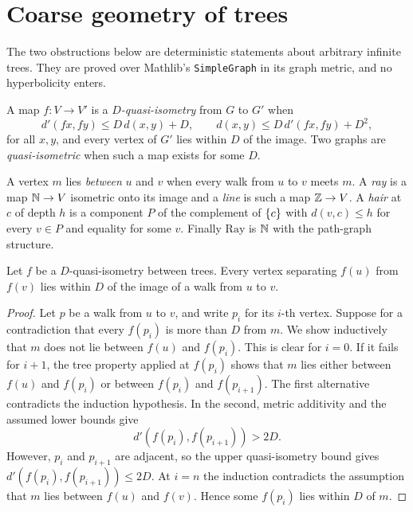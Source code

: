 \chapter{Coarse geometry of trees}
\label{ch:geometry}

The two obstructions below are deterministic statements about arbitrary infinite trees. They
are proved over Mathlib's \texttt{SimpleGraph} in its graph metric, and no hyperbolicity
enters.

\begin{definition}
\label{def:qi}
\leanok
A map $f\colon V\to V'$ is a \emph{$D$-quasi-isometry} from $G$ to $G'$ when
\[
  d'(f x,f y)\leq D\,d(x,y)+D,
  \qquad
  d(x,y)\leq D\,d'(f x,f y)+D^2,
\]
for all $x,y$, and every vertex of $G'$ lies within $D$ of the image. Two graphs are
\emph{quasi-isometric} when such a map exists for some $D$.
\end{definition}

\begin{definition}
\label{def:between}
\leanok
A vertex $m$ lies \emph{between} $u$ and $v$ when every walk from $u$ to $v$ meets $m$. A
\emph{ray} is a map $\mathbb{N}\to V$ isometric onto its image and a \emph{line} is such a map
$\mathbb{Z}\to V$. A \emph{hair} at $c$ of depth $h$ is a component $P$ of the complement of
$\{c\}$ with $d(v,c)\leq h$ for every $v\in P$ and equality for some $v$. Finally
$\mathrm{Ray}$ is $\mathbb{N}$ with the path-graph structure.
\end{definition}

\begin{lemma}
\label{lem:stability}
\leanok
Let $f$ be a $D$-quasi-isometry between trees. Every vertex separating $f(u)$ from $f(v)$ lies
within $D$ of the image of a walk from $u$ to $v$.
\end{lemma}

\begin{proof}
\leanok
Let $p$ be a walk from $u$ to $v$, and write $p_i$ for its $i$-th vertex. Suppose for a
contradiction that every $f(p_i)$ is more than $D$ from $m$. We show inductively that $m$
does not lie between $f(u)$ and $f(p_i)$. This is clear for $i=0$. If it fails for $i+1$,
the tree property applied at $f(p_i)$ shows that $m$ lies either between $f(u)$ and
$f(p_i)$ or between $f(p_i)$ and $f(p_{i+1})$. The first alternative contradicts the
induction hypothesis. In the second, metric additivity and the assumed lower bounds give
\[
  d'(f(p_i),f(p_{i+1}))>2D.
\]
However, $p_i$ and $p_{i+1}$ are adjacent, so the upper quasi-isometry bound gives
$d'(f(p_i),f(p_{i+1}))\leq2D$. At $i=n$ the induction contradicts the assumption that $m$
lies between $f(u)$ and $f(v)$. Hence some $f(p_i)$ lies within $D$ of $m$.
\end{proof}

